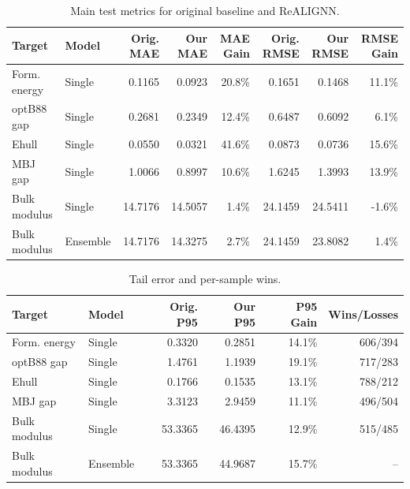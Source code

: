 \begingroup

\begin{table}[htbp]
\centering
\caption{Main test metrics for original baseline and ReALIGNN.}
\footnotesize
\setlength{\tabcolsep}{2.5pt}
\begin{tabular}{llrrrrrr}
\toprule
Target & Model & Orig. MAE & Our MAE & MAE Gain & Orig. RMSE & Our RMSE & RMSE Gain \\
\midrule
Form. energy & Single & 0.1165 & 0.0923 & 20.8\% & 0.1651 & 0.1468 & 11.1\% \\
optB88 gap & Single & 0.2681 & 0.2349 & 12.4\% & 0.6487 & 0.6092 & 6.1\% \\
Ehull & Single & 0.0550 & 0.0321 & 41.6\% & 0.0873 & 0.0736 & 15.6\% \\
MBJ gap & Single & 1.0066 & 0.8997 & 10.6\% & 1.6245 & 1.3993 & 13.9\% \\
Bulk modulus & Single & 14.7176 & 14.5057 & 1.4\% & 24.1459 & 24.5411 & -1.6\% \\
Bulk modulus & Ensemble & 14.7176 & 14.3275 & 2.7\% & 24.1459 & 23.8082 & 1.4\% \\
\bottomrule
\end{tabular}
\end{table}

\vspace{0.8em}

\begin{table}[htbp]
\centering
\caption{Tail error and per-sample wins.}
\footnotesize
\setlength{\tabcolsep}{4.5pt}
\begin{tabular}{llrrrr}
\toprule
Target & Model & Orig. P95 & Our P95 & P95 Gain & Wins/Losses \\
\midrule
Form. energy & Single & 0.3320 & 0.2851 & 14.1\% & 606/394 \\
optB88 gap & Single & 1.4761 & 1.1939 & 19.1\% & 717/283 \\
Ehull & Single & 0.1766 & 0.1535 & 13.1\% & 788/212 \\
MBJ gap & Single & 3.3123 & 2.9459 & 11.1\% & 496/504 \\
Bulk modulus & Single & 53.3365 & 46.4395 & 12.9\% & 515/485 \\
Bulk modulus & Ensemble & 53.3365 & 44.9687 & 15.7\% & -- \\
\bottomrule
\end{tabular}
\end{table}

\endgroup
